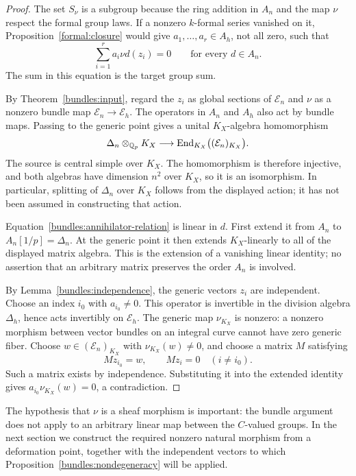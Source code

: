 \begin{proof}
The set $S_\nu$ is a subgroup because the ring addition in $A_n$
and the map $\nu$ respect the formal group laws.  If a nonzero
$k$-formal series vanished on it,
Proposition~\ref{formal:closure} would give $a_1,\ldots,a_r\in A_h$,
not all zero, such that
\begin{equation}
\label{bundles:annihilator-relation}
  \sum_{i=1}^r a_i\nu d(z_i)=0
          \qquad\text{for every }d\in A_n.
\end{equation}
The sum in this equation is the target group sum.

By Theorem~\ref{bundles:input}, regard the $z_i$ as global sections
of $\mathcal E_n$ and $\nu$ as a nonzero bundle map
$\mathcal E_n\to\mathcal E_h$.  The operators in $A_n$ and $A_h$
also act by bundle maps.  Passing to the generic point gives a
unital $K_X$-algebra homomorphism
\[
  \Delta_n\otimes_{\mathbb Q_p}K_X
      \longrightarrow
  \operatorname{End}_{K_X}\bigl((\mathcal E_n)_{K_X}\bigr).
\]
The source is central simple over $K_X$.  The homomorphism is
therefore injective, and both algebras have dimension $n^2$ over
$K_X$, so it is an isomorphism.  In particular, splitting of
$\Delta_n$ over $K_X$ follows from the displayed action; it has
not been assumed in constructing that action.

Equation~\eqref{bundles:annihilator-relation} is linear in $d$.
First extend it from $A_n$ to $A_n[1/p]=\Delta_n$.  At the generic
point it then extends $K_X$-linearly to all of the displayed matrix
algebra.  This is the extension of a vanishing linear identity; no
assertion that an arbitrary matrix preserves the order $A_n$ is
involved.

By Lemma~\ref{bundles:independence}, the generic vectors $z_i$ are
independent.  Choose an index $i_0$ with $a_{i_0}\ne0$.  This
operator is invertible in the division algebra $\Delta_h$, hence
acts invertibly on $\mathcal E_h$.  The generic map $\nu_{K_X}$
is nonzero: a nonzero morphism between vector bundles on an integral
curve cannot have zero generic fiber.  Choose
$w\in(\mathcal E_n)_{K_X}$ with $\nu_{K_X}(w)\ne0$, and choose a
matrix $M$ satisfying
\[
  Mz_{i_0}=w,\qquad Mz_i=0\quad(i\ne i_0).
\]
Such a matrix exists by independence.  Substituting it into the
extended identity gives
$a_{i_0}\nu_{K_X}(w)=0$, a contradiction.
\end{proof}

The hypothesis that $\nu$ is a sheaf morphism is important: the
bundle argument does not apply to an arbitrary linear map between
the $C$-valued groups.  In the next section we construct the required
nonzero natural morphism from a deformation point, together with
the independent vectors to which
Proposition~\ref{bundles:nondegeneracy} will be applied.
